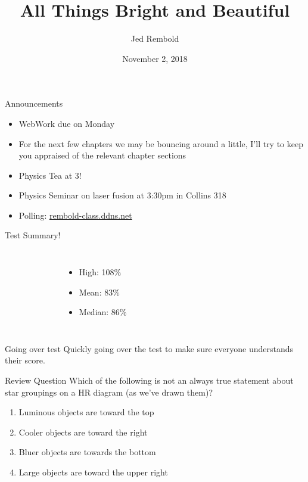 \documentclass[pdf, aspectratio=169]{beamer}
\title{All Things Bright and Beautiful}
\date{November 2, 2018}
\author{Jed Rembold}
\begin{document}
\renewcommand*{\theenumi}{\Alph{enumi}}

\begin{frame}{Announcements}
  \begin{itemize}
	  \item WebWork due on Monday
	  \item For the next few chapters we may be bouncing around a little, I'll try to keep you appraised of the relevant chapter sections
	  \item Physics Tea at 3!
	  \item Physics Seminar on laser fusion at 3:30pm in Collins 318
	\item Polling: \url{rembold-class.ddns.net}
  \end{itemize}
\end{frame}

\begin{frame}{Test Summary!}
  \begin{columns}
	  \begin{figure}[h!]
		\centering
	  \end{figure}
	  \begin{itemize}
		\item High: 108\%
		\item Mean: 83\%
		\item Median: 86\%
	  \end{itemize}
	\end{columns}
\end{frame}

\begin{frame}{Going over test}
	Quickly going over the test to make sure everyone understands their score.
\end{frame}


\begin{frame}{Review Question}
  Which of the following is \alert{not} an always true statement about star groupings on a HR diagram (as we've drawn them)?
  \begin{enumerate}
	\item Luminous objects are toward the top
	\item Cooler objects are toward the right
	\item \alert<2>{Bluer objects are towards the bottom}
	\item Large objects are toward the upper right
  \end{enumerate}
\end{frame}
\end{document}

